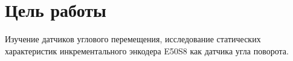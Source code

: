 \section{Цель работы}
Изучение датчиков углового перемещения, исследование статических характеристик инкрементального энкодера E50S8 как датчика угла поворота.